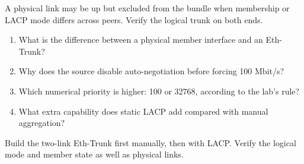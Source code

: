\begin{pitfall}
A physical link may be up but excluded from the bundle when membership or LACP mode differs across peers. Verify the logical trunk on both ends.
\end{pitfall}

\begin{quickcheck}
\begin{enumerate}
\item What is the difference between a physical member interface and an Eth-Trunk?
\item Why does the source disable auto-negotiation before forcing 100 Mbit/s?
\item Which numerical priority is higher: 100 or 32768, according to the lab's rule?
\item What extra capability does static LACP add compared with manual aggregation?
\end{enumerate}
\end{quickcheck}

\begin{chapterrecap}
Build the two-link Eth-Trunk first manually, then with LACP. Verify the logical mode and member state as well as physical links.
\end{chapterrecap}


